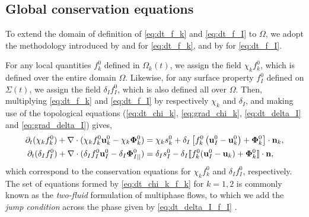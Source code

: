 \subsection{Global conservation equations}

To extend the domain of definition of \ref{eq:dt_f_k} and \ref{eq:dt_f_I} to $\Omega$, we adopt the methodology introduced by \citet{drew1983mathematical} and \citet{kataoka1986local} for \ref{eq:dt_f_k}, and by \citet[Appendix 2]{marle1982macroscopic} for \ref{eq:dt_f_I}.

For any local quantities $f_k^0$ defined in $\Omega_k(t)$, we assign the field $\chi_k f_k^0$, which is defined over the entire domain $\Omega$. 
Likewise, for any surface property $f_I^0$ defined on $\Sigma(t)$, we assign the field $\delta_I f_I^0$, which is also defined all over $\Omega$. 
Then, multiplying \ref{eq:dt_f_k} and \ref{eq:dt_f_I} by respectively $\chi_k$ and $\delta_I$, and making use of the topological equations (\ref{eq:dt_chi_k}, \ref{eq:grad_chi_k}, \ref{eq:dt_delta_I} and \ref{eq:grad_delta_I}) gives, 
\begin{align}
    \partial_t (\chi_k f_k^0)
    + \mathbf{\nabla}\cdot (
        \chi_k f_k^0 \textbf{u}_k^0
        - \chi_k \mathbf{\Phi}_k^0 
        )
    &= 
    \chi_k s_k^0
    + \delta_I\left[
        f_k^0
        \left(
            \textbf{u}_I^0
            - \textbf{u}_k^0
        \right)
        + \mathbf{\Phi}_k^0
    \right]
    \cdot \textbf{n}_k ,
    \label{eq:dt_chi_k_f_k}\\
    \partial_t (\delta_If_I^0)  
    + \mathbf{\nabla}\cdot (
        \delta_I f_I^0 \textbf{u}_I^0
        - \delta_I \mathbf{\Phi}_{I||}^0 
        )
    &= 
    \delta_Is_I^0
    - \delta_I \llbracket 
    f_k^0 (\textbf{u}_I^0 - \textbf{u}_k)
    + \mathbf{\Phi}_k^0
     \rrbracket \cdot \textbf{n},
    \label{eq:dt_delta_I_f_I}
\end{align}
which correspond to the conservation equations for $\chi_kf_k^0$ and $\delta_If_I^0$, respectively.
The set of equations formed by \ref{eq:dt_chi_k_f_k} for $k =1,2$ is commonly known as the \textit{two-fluid} formulation of multiphase flows, to which we add the \textit{jump condition} across the phase given by \ref{eq:dt_delta_I_f_I} \citep{morel2015mathematical,tryggvason2011direct,drew1983mathematical,kataoka1986local}. 

